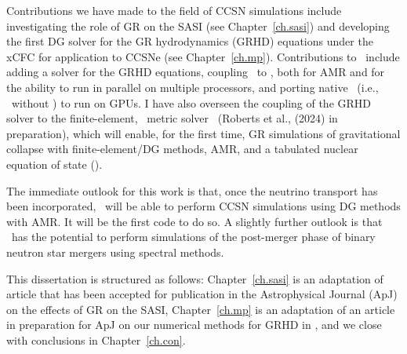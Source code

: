 Contributions we have made to the field of CCSN simulations
include investigating the role of GR
on the SASI (see Chapter~\ref{ch.sasi}) and developing the first DG solver
for the GR hydrodynamics (GRHD) equations under the xCFC
for application to CCSNe (see Chapter~\ref{ch.mp}).
Contributions to \thornado\ include adding a solver for the GRHD equations,
coupling \thornado\ to \amrex, both for AMR and for the ability to run
in parallel on multiple processors,
and porting native \thornado\ (i.e., \thornado\ without \amrex)
to run on GPUs.
I have also overseen the coupling of the GRHD solver
to the finite-element, \xcfc\ metric solver \poseidon\ (Roberts et al.,
(2024) in preparation),
which will enable, for the first time,
GR simulations of gravitational collapse with finite-element/DG methods, AMR,
and a tabulated nuclear equation of state (\eos).

The immediate outlook for this work is that, once the neutrino transport
has been incorporated, \thornado\ will be able to perform CCSN simulations
using DG methods with AMR.
It will be the first code to do so.
A slightly further outlook is that \thornado\ has the potential to perform
simulations of the post-merger phase of binary neutron star mergers
using spectral methods.

This dissertation is structured as follows: Chapter~\ref{ch.sasi} is an adaptation
of article that has been accepted for publication in the Astrophysical Journal (ApJ)
on the effects of GR on the SASI,
Chapter~\ref{ch.mp} is an adaptation of an article in preparation for ApJ on our
numerical methods for GRHD in \thornado,
and we close with conclusions in Chapter~\ref{ch.con}.

